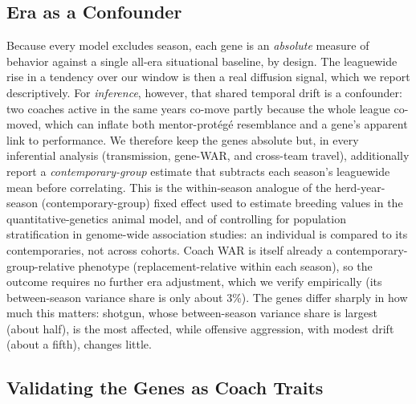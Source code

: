 \documentclass[USenglish]{article}
\theoremstyle{dgthm}
\theoremstyle{dgdef}
\begin{document}
\subsection{Era as a Confounder}
\label{sec:era}

Because every model excludes season, each gene is an \emph{absolute} measure of behavior against a single all-era situational baseline, by design. The leaguewide rise in a tendency over our window is then a real diffusion signal, which we report descriptively. For \emph{inference}, however, that shared temporal drift is a confounder: two coaches active in the same years co-move partly because the whole league co-moved, which can inflate both mentor-prot\'{e}g\'{e} resemblance and a gene's apparent link to performance. We therefore keep the genes absolute but, in every inferential analysis (transmission, gene-WAR, and cross-team travel), additionally report a \emph{contemporary-group} estimate that subtracts each season's leaguewide mean before correlating. This is the within-season analogue of the herd-year-season (contemporary-group) fixed effect used to estimate breeding values in the quantitative-genetics animal model, and of controlling for population stratification in genome-wide association studies: an individual is compared to its contemporaries, not across cohorts. Coach WAR is itself already a contemporary-group-relative phenotype (replacement-relative within each season), so the outcome requires no further era adjustment, which we verify empirically (its between-season variance share is only about 3\%). The genes differ sharply in how much this matters: shotgun, whose between-season variance share is largest (about half), is the most affected, while offensive aggression, with modest drift (about a fifth), changes little.

\subsection{Validating the Genes as Coach Traits}
\end{document}
